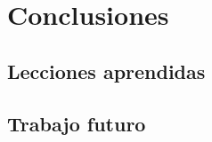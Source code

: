 \chapter{Conclusiones}
\label{ch:conclusiones}

\section{Lecciones aprendidas}

\section{Trabajo futuro}